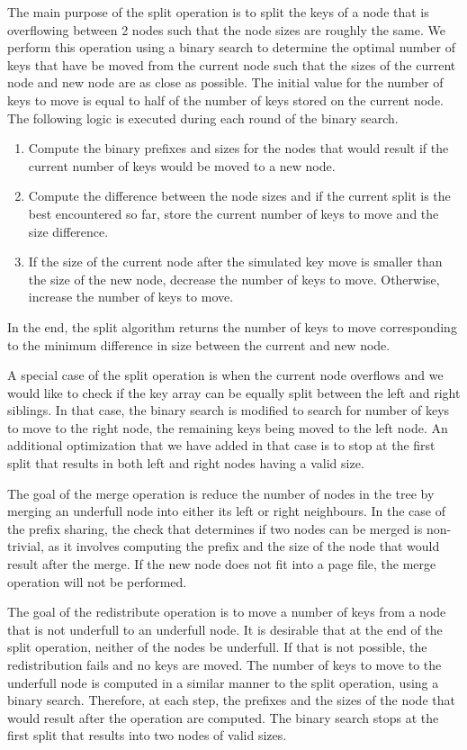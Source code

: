 \documentclass[11pt,a4paper,oneside]{article}
\begin{document}
The main purpose of the split operation is to split the keys of a node that is overflowing between 2 nodes such that the node sizes are roughly the same. We perform this operation using a binary search to determine the optimal number of keys that have be moved from the current node such that the sizes of the current node and new node are as close as possible. The initial value for the number of keys to move is equal to half of the number of keys stored on the current node. The following logic is executed during each round of the binary search. 
\begin{enumerate}
	\item Compute the binary prefixes and sizes for the nodes that would result if the current number of keys would be moved to a 
	new node. 
	\item Compute the difference between the node sizes and if the current split is the best encountered so far, store the current number of keys to move and the size difference.
	\item If the size of the current node after the simulated key move is smaller than the size of the new node, decrease the number of keys to move. Otherwise, increase the number of keys to move.
\end{enumerate}
In the end, the split algorithm returns the number of keys to move corresponding to the minimum difference in size between the current and new node.

A special case of the split operation is when the current node overflows and we would like to check if the key array can be equally split between the left and right siblings. In that case, the binary search is modified to search for number of keys to move to the right node, the remaining keys being moved to the left node. An additional optimization that we have added in that case is to stop at the first split that results in both left and right nodes having a valid size.

The goal of the merge operation is reduce the number of nodes in the tree by merging an underfull node into either its left or right neighbours. In the case of the prefix sharing, the check that determines if two nodes can be merged is non-trivial, as it involves computing the prefix and the size of the node that would result after the merge. If the new node does not fit into a page file, the merge operation will not be performed.

The goal of the redistribute operation is to move a number of keys from a node that is not underfull to an underfull node. It is desirable that at the end of the split operation, neither of the nodes be underfull. If that is not possible, the redistribution fails and no keys are moved. The number of keys to move to the underfull node is computed in a similar manner to the split operation, using a binary search. Therefore, at each step, the prefixes and the sizes of the node that would result after the operation are computed. The binary search stops at the first split that results into two nodes of valid sizes.
\end{document}
